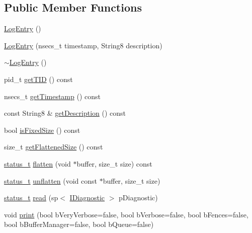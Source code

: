 \subsection*{Public Member Functions}
\begin{DoxyCompactItemize}
\item 
\mbox{\hyperlink{classLogEntry_a78c2786c30d8d6ba4b2aa8b372f58305}{Log\+Entry}} ()
\item 
\mbox{\hyperlink{classLogEntry_a484dd0b15f1339e654b526a8a9a431a3}{Log\+Entry}} (nsecs\+\_\+t timestamp, String8 description)
\item 
\mbox{\hyperlink{classLogEntry_ae0da106e665ca859be1a30ea316cd7d2}{$\sim$\+Log\+Entry}} ()
\item 
pid\+\_\+t \mbox{\hyperlink{classLogEntry_a50403241bb451c7faabc6d7bb9650221}{get\+T\+ID}} () const
\item 
nsecs\+\_\+t \mbox{\hyperlink{classLogEntry_aaf6bd4d7c0c18071fdb39c49a2de6064}{get\+Timestamp}} () const
\item 
const String8 \& \mbox{\hyperlink{classLogEntry_a90c8f3d3f2f52c237d6a43ca801d1b6d}{get\+Description}} () const
\item 
bool \mbox{\hyperlink{classLogEntry_a5711231fdc0709752e67aa82fad051e1}{is\+Fixed\+Size}} () const
\item 
size\+\_\+t \mbox{\hyperlink{classLogEntry_aecaa8f3ac612c7faa86c2790d8d6d420}{get\+Flattened\+Size}} () const
\item 
\mbox{\hyperlink{hwcserviceapi_8h_a3806fb2027d9a316d8ca8d9b8b8eb96f}{status\+\_\+t}} \mbox{\hyperlink{classLogEntry_a479ac501aaf9e4fc11c5a6d118b65dc1}{flatten}} (void $\ast$buffer, size\+\_\+t size) const
\item 
\mbox{\hyperlink{hwcserviceapi_8h_a3806fb2027d9a316d8ca8d9b8b8eb96f}{status\+\_\+t}} \mbox{\hyperlink{classLogEntry_ae5b14d452a6f948ed9a00a5446d5aa1b}{unflatten}} (void const $\ast$buffer, size\+\_\+t size)
\item 
\mbox{\hyperlink{hwcserviceapi_8h_a3806fb2027d9a316d8ca8d9b8b8eb96f}{status\+\_\+t}} \mbox{\hyperlink{classLogEntry_a1c92a359f9d4e3635ae3c2f228ff6206}{read}} (sp$<$ \mbox{\hyperlink{classhwcomposer_1_1IDiagnostic}{I\+Diagnostic}} $>$ p\+Diagnostic)
\item 
void \mbox{\hyperlink{classLogEntry_a15620abfed3ae9b39e565de00b50cf00}{print}} (bool b\+Very\+Verbose=false, bool b\+Verbose=false, bool b\+Fences=false, bool b\+Buffer\+Manager=false, bool b\+Queue=false)
\end{DoxyCompactItemize}
